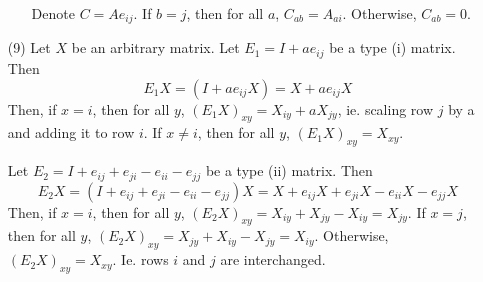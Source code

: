 \begin{itemize}
\begin{itemize}
Denote $C = Ae_{ij}$. If $b = j$, then for all $a$, $C_{ab} = A_{ai}$. Otherwise, $C_{ab} = 0$.
\end{itemize}
\item[(9)]
Let $X$ be an arbitrary matrix. Let $E_1 = I + ae_{ij}$ be a type (i) matrix. Then
$$E_1X = (I + ae_{ij}X) = X + ae_{ij}X$$
Then, if $x = i$, then for all $y$, $(E_1X)_{xy} = X_{iy} + aX_{jy}$, ie. scaling row $j$ by a and adding it to row $i$. If $x \neq i$, then for all $y$, $(E_1X)_{xy} = X_{xy}$.

Let $E_2 = I + e_{ij} + e_{ji} - e_{ii} - e_{jj}$ be a type (ii) matrix. Then
$$E_2X = (I + e_{ij} + e_{ji} - e_{ii} - e_{jj})X = X + e_{ij}X + e_{ji}X - e_{ii}X - e_{jj}X$$
Then, if $x = i$, then for all $y$, $(E_2X)_{xy} = X_{iy} + X_{jy} - X_{iy} = X_{jy}$. If $x = j$, then for all $y$, $(E_2X)_{xy} = X_{jy} + X_{iy} - X_{jy} = X_{iy}$. Otherwise, $(E_2X)_{xy} = X_{xy}$. Ie. rows $i$ and $j$ are interchanged.


\end{itemize}
